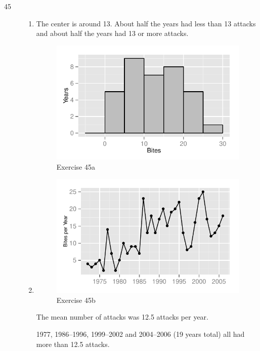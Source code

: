 \documentclass[letterpaper, landscape]{exam}
\begin{document}
\begin{description}
\begin{enumerate}[{a}]
        \end{enumerate}

      \newpage

      \item[45]
        \begin{enumerate}[{a}]
          \item
            The center is around 13.  About half the years had less than 13
            attacks and about half the years had 13 or more attacks.  

            \begin{figure}[H]
              \centering
              \includegraphics{figures/ex45a.pdf}
              \caption{Exercise 45a}
            \end{figure}

          \item
            \begin{figure}[H]
              \centering
              \includegraphics{figures/ex45b.pdf}
              \caption{Exercise 45b}
            \end{figure}

            The mean number of attacks was 12.5 attacks per year.

            1977, 1986--1996, 1999--2002 and 2004--2006 (19 years total)
            all had more than 12.5 attacks.

        \end{enumerate}


    \end{description}
\end{document}
